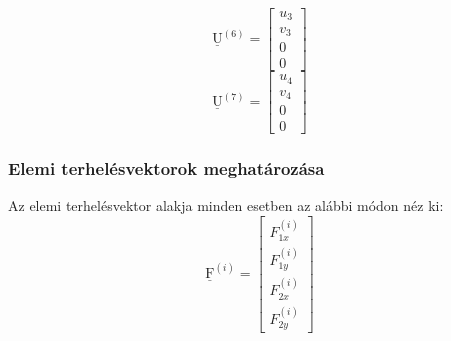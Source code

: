 \documentclass[12pt,a4paper]{article}
\def\vec#1{\underline{\mathrm{#1}}}
\def\i{\left(i\right)}
\begin{document}
\begin{multicols}{7}
    \columnbreak
    \begin{equation*}
        \vec{U}^{\left(6\right)}=
        \begin{bmatrix}
            u_3 \\
            v_3 \\
            0   \\
            0
        \end{bmatrix}
    \end{equation*}
    \columnbreak
    \begin{equation*}
        \vec{U}^{\left(7\right)}=
        \begin{bmatrix}
            u_4 \\
            v_4 \\
            0   \\
            0
        \end{bmatrix}
    \end{equation*}
\end{multicols}
\subsubsection{Elemi terhelésvektorok meghatározása}
Az elemi terhelésvektor alakja minden esetben az alábbi módon néz ki:
\begin{equation}
    \vec{F}^{\i}=
    \begin{bmatrix}
        F_{1x}^{\i} \\
        F_{1y}^{\i} \\
        F_{2x}^{\i} \\
        F_{2y}^{\i}
    \end{bmatrix}
\end{equation}
\end{document}
